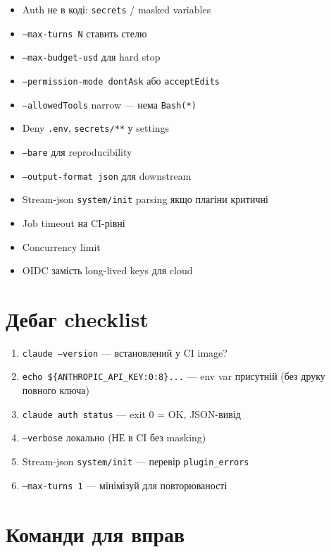 \documentclass[11pt,a4paper]{article}
\begin{document}
\begin{itemize}[leftmargin=2em]
\item[$\square$] Auth не в коді: \texttt{secrets} / masked variables
\item[$\square$] \texttt{--max-turns N} ставить стелю
\item[$\square$] \texttt{--max-budget-usd} для hard stop
\item[$\square$] \texttt{--permission-mode dontAsk} або \texttt{acceptEdits}
\item[$\square$] \texttt{--allowedTools} narrow --- нема \texttt{Bash(*)}
\item[$\square$] Deny \texttt{.env}, \texttt{secrets/**} у settings
\item[$\square$] \texttt{--bare} для reproducibility
\item[$\square$] \texttt{--output-format json} для downstream
\item[$\square$] Stream-json \texttt{system/init} parsing якщо плагіни критичні
\item[$\square$] Job timeout на CI-рівні
\item[$\square$] Concurrency limit
\item[$\square$] OIDC замість long-lived keys для cloud
\end{itemize}

\section{Дебаг checklist}

\begin{enumerate}
\item \texttt{claude --version} --- встановлений у CI image?
\item \texttt{echo \$\{ANTHROPIC\_API\_KEY:0:8\}...} --- env var присутній (без друку повного ключа)
\item \texttt{claude auth status} --- exit 0 = OK, JSON-вивід
\item \texttt{--verbose} локально (НЕ в CI без masking)
\item Stream-json \texttt{system/init} --- перевір \texttt{plugin\_errors}
\item \texttt{--max-turns 1} --- мінімізуй для повторюваності
\end{enumerate}

\section{Команди для вправ}
\end{document}
